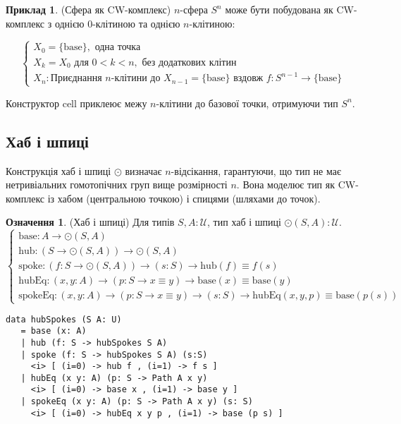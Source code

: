 \documentclass{article}
\theoremstyle{definition}
\newtheorem{definition}{Означення}
\newtheorem{example}{Приклад}
\begin{document}
\begin{example} (Сфера як CW-комплекс)
\( n \)-сфера \( S^n \) може бути побудована як CW-комплекс з
однією 0-клітиною та однією \( n \)-клітиною:

\[
\begin{cases}
X_0 = \{ \text{base} \}, \text{ одна точка} \\
X_k = X_0 \text{ для } 0 < k < n, \text{ без додаткових клітин} \\
X_n: \text{Приєднання } n\text{-клітини до } X_{n-1} = \{ \text{base} \} \text{ вздовж } f : S^{n-1} \to \{ \text{base} \}
\end{cases}
\]

Конструктор \( \text{cell} \) приклеює межу \( n \)-клітини
до базової точки, отримуючи тип \( S^n \).
\end{example}

\subsection{Хаб і шпиці}
Конструкція хаб і шпиці \( \odot \) визначає \( n \)-відсікання,
гарантуючи, що тип не має нетривіальних гомотопічних груп вище
розмірності \( n \). Вона моделює тип як CW-комплекс із
хабом (центральною точкою) і спицями (шляхами до точок).

\begin{definition} (Хаб і шпиці)
Для типів \( S, A : \mathcal{U} \), тип хаб і шпиці \( \odot(S,A) : \mathcal{U} \).
\[
\begin{cases}
\text{base} : A \to \odot(S,A) \\
\text{hub} : (S \to \odot(S,A)) \to \odot(S,A) \\
\text{spoke} : (f : S \to \odot(S,A)) \to (s : S) \to \text{hub}(f) \equiv f(s) \\
\text{hubEq} : (x, y : A) \to (p : S \to x \equiv y) \to \text{base}(x) \equiv \text{base}(y) \\
\text{spokeEq} : (x, y : A) \to (p : S \to x \equiv y) \to (s : S) \to \text{hubEq}(x,y,p) \equiv \text{base}(p(s))
\end{cases}
\]
\begin{lstlisting}
data hubSpokes (S A: U)
   = base (x: A)
   | hub (f: S -> hubSpokes S A)
   | spoke (f: S -> hubSpokes S A) (s:S)
     <i> [ (i=0) -> hub f , (i=1) -> f s ]
   | hubEq (x y: A) (p: S -> Path A x y)
     <i> [ (i=0) -> base x , (i=1) -> base y ]
   | spokeEq (x y: A) (p: S -> Path A x y) (s: S)
     <i> [ (i=0) -> hubEq x y p , (i=1) -> base (p s) ]
\end{lstlisting}
\end{definition}
\end{document}
